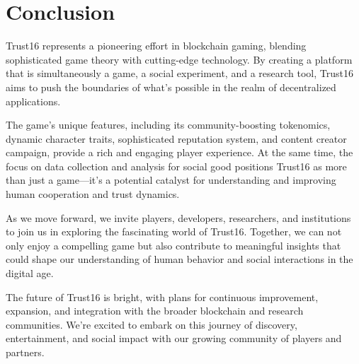 \documentclass[12pt,a4paper]{article}
\begin{document}
\section{Conclusion}

Trust16 represents a pioneering effort in blockchain gaming, blending sophisticated game theory with cutting-edge technology. By creating a platform that is simultaneously a game, a social experiment, and a research tool, Trust16 aims to push the boundaries of what's possible in the realm of decentralized applications.

The game's unique features, including its community-boosting tokenomics, dynamic character traits, sophisticated reputation system, and content creator campaign, provide a rich and engaging player experience. At the same time, the focus on data collection and analysis for social good positions Trust16 as more than just a game—it's a potential catalyst for understanding and improving human cooperation and trust dynamics.

As we move forward, we invite players, developers, researchers, and institutions to join us in exploring the fascinating world of Trust16. Together, we can not only enjoy a compelling game but also contribute to meaningful insights that could shape our understanding of human behavior and social interactions in the digital age.

The future of Trust16 is bright, with plans for continuous improvement, expansion, and integration with the broader blockchain and research communities. We're excited to embark on this journey of discovery, entertainment, and social impact with our growing community of players and partners.
\end{document}
